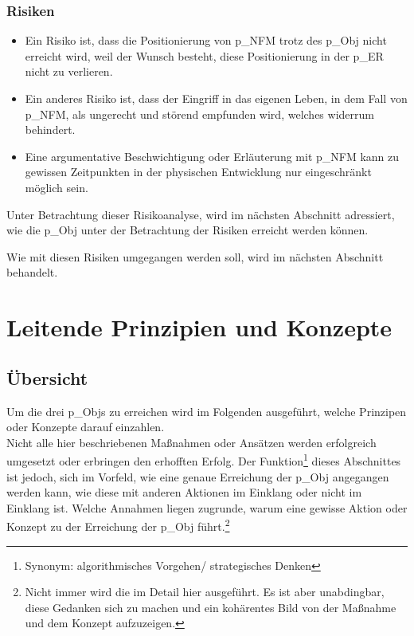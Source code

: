 \subsubsection{Risiken}
\begin{itemize}
	\item Ein Risiko ist, dass die Positionierung von \gls{p_NFM} trotz des \gls{p_Obj} nicht erreicht wird, weil der Wunsch besteht, diese Positionierung in der \gls{p_ER} nicht zu verlieren. 
	\item Ein anderes Risiko ist, dass der Eingriff in das eigenen Leben, in dem Fall von \gls{p_NFM}, als ungerecht und störend empfunden wird, welches widerrum  behindert.
	\item Eine argumentative Beschwichtigung oder Erläuterung mit \gls{p_NFM} kann zu gewissen Zeitpunkten in der physischen Entwicklung nur eingeschränkt möglich sein.
\end{itemize}

Unter Betrachtung dieser Risikoanalyse, wird im nächsten Abschnitt adressiert, wie die \gls{p_Obj} unter der Betrachtung der Risiken erreicht werden können.

Wie mit diesen Risiken umgegangen werden soll, wird im nächsten Abschnitt behandelt.

\section{Leitende Prinzipien und Konzepte}\label{sec:Erreichung}
\subsection{Übersicht}
Um die drei \glspl{p_Obj} zu erreichen wird im Folgenden ausgeführt, welche Prinzipen oder Konzepte darauf einzahlen.\\ 

Nicht alle hier beschriebenen Maßnahmen oder Ansätzen werden erfolgreich umgesetzt oder erbringen den erhofften Erfolg. %
Der Funktion\footnote{
	Synonym: algorithmisches Vorgehen/ strategisches Denken
} dieses Abschnittes ist jedoch, sich im Vorfeld, wie eine genaue Erreichung der \gls{p_Obj} angegangen werden kann, wie diese mit anderen Aktionen im Einklang oder nicht im Einklang ist. Welche Annahmen liegen zugrunde, warum eine gewisse Aktion oder Konzept zu der Erreichung der \gls{p_Obj} führt.\footnote{
	Nicht immer wird die im Detail hier ausgeführt. Es ist aber unabdingbar, diese Gedanken sich zu machen und ein kohärentes Bild von der Maßnahme und dem Konzept aufzuzeigen.
}\\


